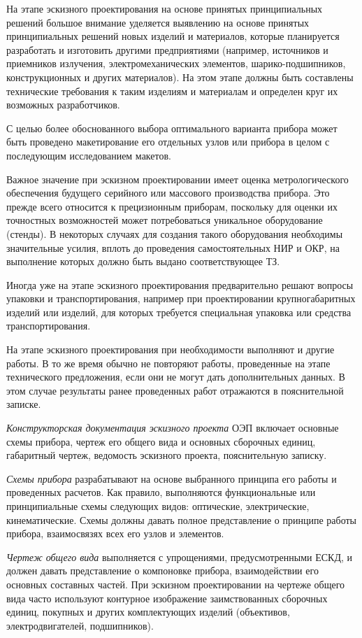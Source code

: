 На этапе эскизного проектирования на основе принятых принципиальных решений большое внимание уделяется выявлению на основе принятых принципиальных решений новых изделий и материалов, которые планируется разработать и изготовить другими предприятиями (например, источников и приемников излучения, электромеханических элементов, шарико-подшипников, конструкционных и других материалов). На этом этапе должны быть составлены технические требования к таким изделиям и материалам и определен круг их возможных разработчиков.

С целью более обоснованного выбора оптимального варианта прибора может быть проведено макетирование его отдельных узлов или прибора в целом с последующим исследованием макетов.

Важное значение при эскизном проектировании имеет оценка метрологического обеспечения будущего серийного или массового производства прибора. Это прежде всего относится к прецизионным приборам, поскольку для оценки их точностных возможностей может потребоваться уникальное оборудование (стенды). В некоторых случаях для создания такого оборудования необходимы значительные усилия, вплоть до проведения самостоятельных НИР и ОКР, на выполнение которых должно быть выдано соответствующее ТЗ.

Иногда уже на этапе эскизного проектирования предварительно решают вопросы упаковки и транспортирования, например при проектировании крупногабаритных изделий или изделий, для которых требуется специальная упаковка или средства транспортирования.

На этапе эскизного проектирования при необходимости выполняют и другие работы. В то же время обычно не повторяют работы, проведенные на этапе технического предложения, если они не могут дать дополнительных данных. В этом случае результаты ранее проведенных работ отражаются в пояснительной записке.

\textit{Конструкторская документация эскизного проекта} ОЭП включает основные схемы прибора, чертеж его общего вида и основных сборочных единиц, габаритный чертеж, ведомость эскизного проекта, пояснительную записку.

\textit{Схемы прибора} разрабатывают на основе выбранного принципа его работы и проведенных расчетов. Как правило, выполняются функциональные или принципиальные схемы следующих видов: оптические, электрические, кинематические. Схемы должны давать полное представление о принципе работы прибора, взаимосвязях всех его узлов и элементов.

\textit{Чертеж общего вида} выполняется с упрощениями, предусмотренными ЕСКД, и должен давать представление о компоновке прибора, взаимодействии его основных составных частей. При эскизном проектировании на чертеже общего вида часто используют контурное изображение заимствованных сборочных единиц, покупных и других комплектующих изделий (объективов, электродвигателей, подшипников).

